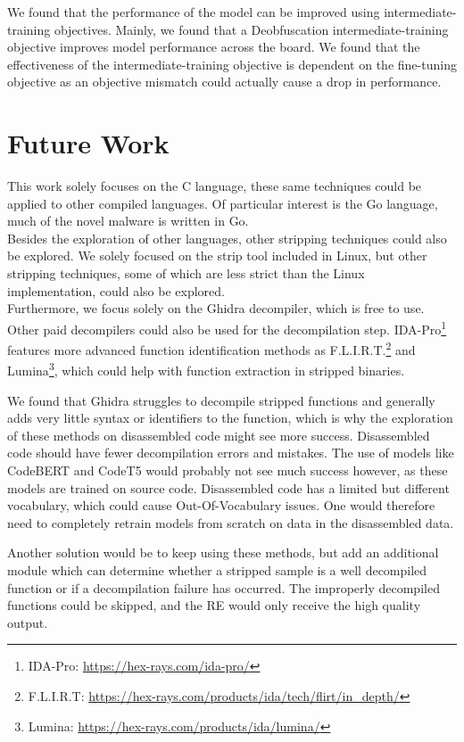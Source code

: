 We found that the performance of the model can be improved using intermediate-training objectives. Mainly, we found that a Deobfuscation intermediate-training objective improves model performance across the board. We found that the effectiveness of the intermediate-training objective is dependent on the fine-tuning objective as an objective mismatch could actually cause a drop in performance.

\section{Future Work}
This work solely focuses on the C language, these same techniques could be applied to other compiled languages. Of particular interest is the Go language, much of the novel malware is written in Go.\\
Besides the exploration of other languages, other stripping techniques could also be explored. We solely focused on the strip tool included in Linux, but other stripping techniques, some of which are less strict than the Linux implementation, could also be explored.\\

Furthermore, we focus solely on the Ghidra decompiler, which is free to use. Other paid decompilers could also be used for the decompilation step. IDA-Pro\footnote{IDA-Pro: \url{https://hex-rays.com/ida-pro/}} features more advanced function identification methods as F.L.I.R.T.\footnote{F.L.I.R.T: \url{https://hex-rays.com/products/ida/tech/flirt/in_depth/}} and Lumina\footnote{Lumina: \url{https://hex-rays.com/products/ida/lumina/}}, which could help with function extraction in stripped binaries.

We found that Ghidra struggles to decompile stripped functions and generally adds very little syntax or identifiers to the function, which is why the exploration of these methods on disassembled code might see more success. Disassembled code should have fewer decompilation errors and mistakes. The use of models like CodeBERT and CodeT5 would probably not see much success however, as these models are trained on source code. Disassembled code has a limited but different vocabulary, which could cause Out-Of-Vocabulary issues. One would therefore need to completely retrain models from scratch on data in the disassembled data.

Another solution would be to keep using these methods, but add an additional module which can determine whether a stripped sample is a well decompiled function or if a decompilation failure has occurred. The improperly decompiled functions could be skipped, and the RE would only receive the high quality output.

